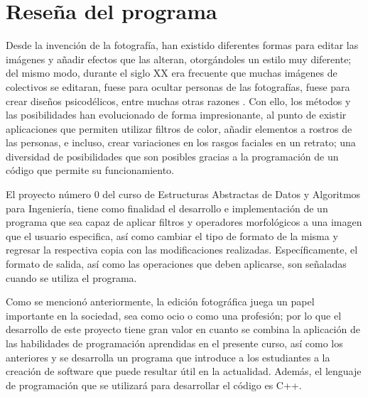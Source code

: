 \tableofcontents
\listoffigures
\newpage

\section{Reseña del programa}
	Desde la invención de la fotografía, han existido diferentes formas para editar las imágenes y añadir efectos que las 
	alteran, otorgándoles un estilo muy diferente; del mismo modo, durante el siglo XX era frecuente que muchas imágenes de 
	colectivos se editaran, fuese para ocultar personas de las fotografías, fuese para crear diseños psicodélicos, entre muchas
	otras razones \cite{Murias}. Con ello, los métodos y las posibilidades han evolucionado de forma impresionante, al punto
	de existir aplicaciones que permiten utilizar filtros de color, añadir elementos a rostros de las personas, e incluso,
	crear variaciones en los rasgos faciales en un retrato; una diversidad de posibilidades que son posibles gracias a la 
	programación de un código que permite su funcionamiento.

	
	El proyecto número 0 del curso de Estructuras Abstractas de Datos y Algoritmos para Ingeniería, tiene como finalidad el 
	desarrollo e implementación de un programa que sea capaz de aplicar filtros y operadores morfológicos a una imagen que el
	usuario especifica, así como cambiar el tipo de formato de la misma y regresar la respectiva copia con las modificaciones 
	realizadas. Específicamente, el formato de salida, así como las operaciones que deben aplicarse, son señaladas cuando se 
	utiliza el programa.

	
	Como se mencionó anteriormente, la edición fotográfica juega un papel importante en la sociedad, sea como ocio o como una
	profesión; por lo que el desarrollo de este proyecto tiene gran valor en cuanto se combina la aplicación de las habilidades 
	de programación aprendidas en el presente curso, así como los anteriores y se desarrolla un programa que introduce a los 
	estudiantes a la creación de software que puede resultar útil en la actualidad. Además, el lenguaje de programación que se
	utilizará para desarrollar el código es C++.


